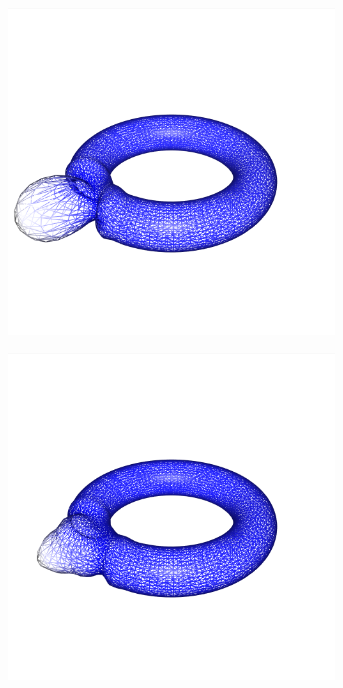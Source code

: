 \documentclass[crop=false]{standalone}
\begin{document}
    \begin{figure}[h]
      \center
      \begin{subfigure}[b]{0.24\textwidth}
        \center
        \includegraphics[trim={0.2cm 3.9cm 3.15cm 5.8cm},clip,width=0.95\textwidth]{images/torus_wave_0.png}
        \caption{}
      \end{subfigure}
      \begin{subfigure}[b]{0.24\textwidth}
        \center
        \includegraphics[trim={0.2cm 3.9cm 3.15cm 5.8cm},clip,width=0.95\textwidth]{images/torus_wave_1.png}

\end{subfigure}
\end{figure}
\end{document}
